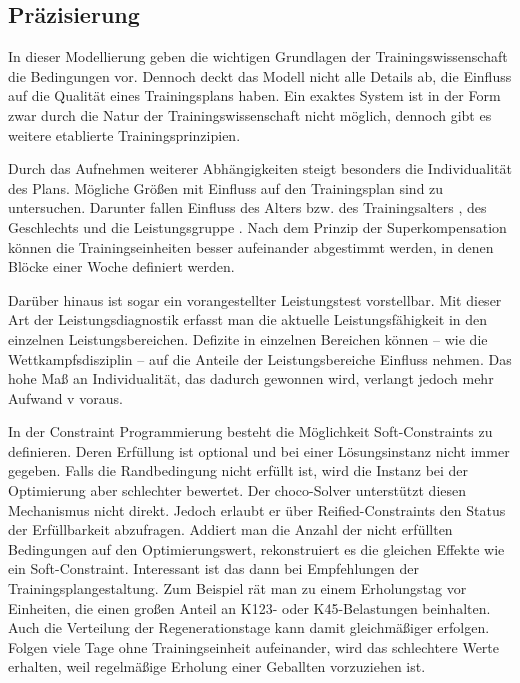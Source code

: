 \subsection{Präzisierung}
In dieser Modellierung geben die wichtigen Grundlagen der Trainingswissenschaft die Bedingungen vor. Dennoch deckt das Modell nicht alle Details ab, die Einfluss auf die Qualität eines Trainingsplans haben. Ein exaktes System ist in der Form zwar durch die Natur der Trainingswissenschaft nicht möglich, dennoch gibt es weitere etablierte Trainingsprinzipien. \par
Durch das Aufnehmen weiterer Abhängigkeiten steigt besonders die Individualität des Plans. Mögliche Größen mit Einfluss auf den Trainingsplan sind zu untersuchen. Darunter fallen Einfluss des Alters bzw. des Trainingsalters \cite[181]{EinfuerungTrainingswissenschaft}, des Geschlechts und die Leistungsgruppe \cite[S. 173]{Radsporttraining}. Nach dem Prinzip der Superkompensation können die Trainingseinheiten besser aufeinander abgestimmt werden, in denen Blöcke einer Woche definiert werden. \par
Darüber hinaus ist sogar ein vorangestellter Leistungstest vorstellbar. Mit dieser Art der Leistungsdiagnostik erfasst man die aktuelle Leistungsfähigkeit in den einzelnen Leistungsbereichen. Defizite in einzelnen Bereichen können --  wie die Wettkampfsdisziplin -- auf die Anteile der Leistungsbereiche Einfluss nehmen. Das hohe Maß an Individualität, das dadurch gewonnen wird, verlangt jedoch mehr Aufwand v voraus. \par
In der Constraint Programmierung besteht die Möglichkeit Soft-Constraints zu definieren. Deren Erfüllung ist optional und bei einer Lösungsinstanz nicht immer gegeben. Falls die Randbedingung nicht erfüllt ist, wird die Instanz bei der Optimierung aber schlechter bewertet. Der choco-Solver unterstützt diesen Mechanismus nicht direkt. Jedoch erlaubt er über Reified-Constraints den Status der Erfüllbarkeit abzufragen. Addiert man die Anzahl der nicht erfüllten Bedingungen auf den Optimierungswert, rekonstruiert es die gleichen Effekte wie ein Soft-Constraint. Interessant ist das dann bei Empfehlungen der Trainingsplangestaltung. Zum Beispiel rät man zu einem Erholungstag vor Einheiten, die einen großen Anteil an K123- oder K45-Belastungen beinhalten. Auch die Verteilung der Regenerationstage kann damit gleichmäßiger erfolgen. Folgen viele Tage ohne Trainingseinheit aufeinander, wird das schlechtere Werte erhalten, weil regelmäßige Erholung einer Geballten vorzuziehen ist.
   
